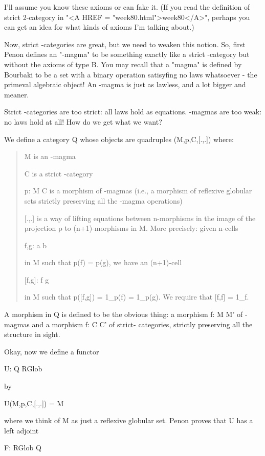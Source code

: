 I'll assume you know these axioms or can fake it.  (If you
read the definition of strict 2-category in "<A HREF = "week80.html">week80</A>", perhaps
you can get an idea for what kinds of axioms I'm talking about.)

Now, strict \omega -categories are great, but we need to weaken this
notion.  So, first Penon defines an "\omega -magma" to be something
exactly like a strict \omega -category but without the axioms of type B.
You may recall that a "magma" is defined by Bourbaki to be a set with
a binary operation satisyfing no laws whatsoever - the primeval
algebraic object!  An \omega -magma is just as lawless, and a lot bigger
and meaner.

Strict \omega -categories are too strict: all laws hold as equations.
\Omega -magmas are too weak: no laws hold at all!  How do we get what
we want?  

We define a category Q whose objects are quadruples (M,p,C,[.,.])
where:

\begin{quote}
M is an \omega -magma 

C is a strict \omega -category

p: M \to  C is a morphism of \omega -magmas (i.e., a morphism of
reflexive globular sets strictly preserving all the \omega -magma
operations)

[.,.] is a way of lifting equations between n-morphisms in the 
image of the projection p to (n+1)-morphisms in M.  More precisely: 
given n-cells

f,g: a \to  b

in M such that p(f) = p(g), we have an (n+1)-cell

[f,g]: f \to  g

in M such that p([f,g]) = 1_{p(f)} = 1_{p(g)}.  
We require that [f,f] = 1_{f}.

\end{quote}
A morphism in Q is defined to be the obvious thing: a morphism
f: M \to  M' of \omega -magmas and a morphism f: C \to  C' of strict-\omega 
categories, strictly preserving all the structure in sight.

Okay, now we define a functor

U: Q \to  RGlob

by 

U(M,p,C,[.,.]) = M

where we think of M as just a reflexive globular set.  Penon
proves that U has a left adjoint

F: RGlob \to  Q


